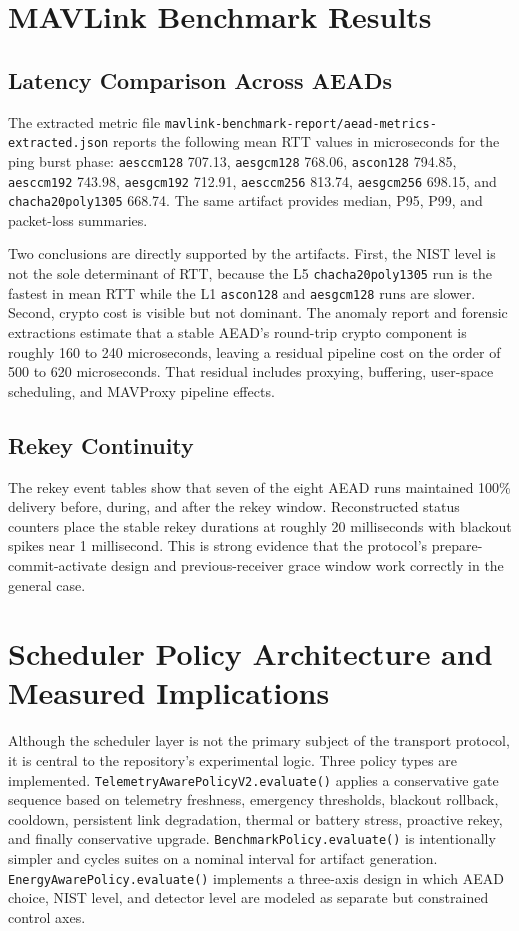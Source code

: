 \documentclass[11pt]{article}
\begin{document}
\section{MAVLink Benchmark Results}
\subsection{Latency Comparison Across AEADs}
The extracted metric file \texttt{mavlink-benchmark-report/aead-metrics-extracted.json} reports the following mean RTT values in microseconds for the ping burst phase: \texttt{aesccm128} 707.13, \texttt{aesgcm128} 768.06, \texttt{ascon128} 794.85, \texttt{aesccm192} 743.98, \texttt{aesgcm192} 712.91, \texttt{aesccm256} 813.74, \texttt{aesgcm256} 698.15, and \texttt{chacha20poly1305} 668.74. The same artifact provides median, P95, P99, and packet-loss summaries.

Two conclusions are directly supported by the artifacts. First, the NIST level is not the sole determinant of RTT, because the L5 \texttt{chacha20poly1305} run is the fastest in mean RTT while the L1 \texttt{ascon128} and \texttt{aesgcm128} runs are slower. Second, crypto cost is visible but not dominant. The anomaly report and forensic extractions estimate that a stable AEAD's round-trip crypto component is roughly 160 to 240 microseconds, leaving a residual pipeline cost on the order of 500 to 620 microseconds. That residual includes proxying, buffering, user-space scheduling, and MAVProxy pipeline effects.

\subsection{Rekey Continuity}
The rekey event tables show that seven of the eight AEAD runs maintained 100\% delivery before, during, and after the rekey window. Reconstructed status counters place the stable rekey durations at roughly 20 milliseconds with blackout spikes near 1 millisecond. This is strong evidence that the protocol's prepare-commit-activate design and previous-receiver grace window work correctly in the general case.

\section{Scheduler Policy Architecture and Measured Implications}
Although the scheduler layer is not the primary subject of the transport protocol, it is central to the repository's experimental logic. Three policy types are implemented. \texttt{TelemetryAwarePolicyV2.evaluate()} applies a conservative gate sequence based on telemetry freshness, emergency thresholds, blackout rollback, cooldown, persistent link degradation, thermal or battery stress, proactive rekey, and finally conservative upgrade. \texttt{BenchmarkPolicy.evaluate()} is intentionally simpler and cycles suites on a nominal interval for artifact generation. \texttt{EnergyAwarePolicy.evaluate()} implements a three-axis design in which AEAD choice, NIST level, and detector level are modeled as separate but constrained control axes.
\end{document}

